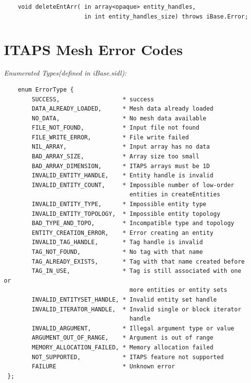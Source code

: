 \documentclass{article}
\begin{document}
\begin{verbatim}
    void deleteEntArr( in array<opaque> entity_handles, 
                       in int entity_handles_size) throws iBase.Error;
\end{verbatim}


\section{ITAPS Mesh Error Codes}

\emph{Enumerated Types(defined in iBase.sidl):}

\begin{verbatim}
    enum ErrorType {
        SUCCESS,                  * success 
        DATA_ALREADY_LOADED,      * Mesh data already loaded
        NO_DATA,                  * No mesh data available 
        FILE_NOT_FOUND,           * Input file not found 
        FILE_WRITE_ERROR,         * File write failed
        NIL_ARRAY,                * Input array has no data
        BAD_ARRAY_SIZE,           * Array size too small 
        BAD_ARRAY_DIMENSION,      * ITAPS arrays must be 1D
        INVALID_ENTITY_HANDLE,    * Entity handle is invalid 
        INVALID_ENTITY_COUNT,     * Impossible number of low-order
                                    entities in createEntities 
        INVALID_ENTITY_TYPE,      * Impossible entity type 
        INVALID_ENTITY_TOPOLOGY,  * Impossible entity topology 
        BAD_TYPE_AND_TOPO,        * Incompatible type and topology 
        ENTITY_CREATION_ERROR,    * Error creating an entity 
        INVALID_TAG_HANDLE,       * Tag handle is invalid  
        TAG_NOT_FOUND,            * No tag with that name 
        TAG_ALREADY_EXISTS,       * Tag with that name created before  
        TAG_IN_USE,               * Tag is still associated with one or
                                    more entities or entity sets
        INVALID_ENTITYSET_HANDLE, * Invalid entity set handle 
        INVALID_ITERATOR_HANDLE,  * Invalid single or block iterator
                                    handle  
        INVALID_ARGUMENT,         * Illegal argument type or value
        ARGUMENT_OUT_OF_RANGE,    * Argument is out of range  
        MEMORY_ALLOCATION_FAILED, * Memory allocation failed 
        NOT_SUPPORTED,            * ITAPS feature not supported
        FAILURE                   * Unknown error
 };
\end{verbatim}
\end{document}
